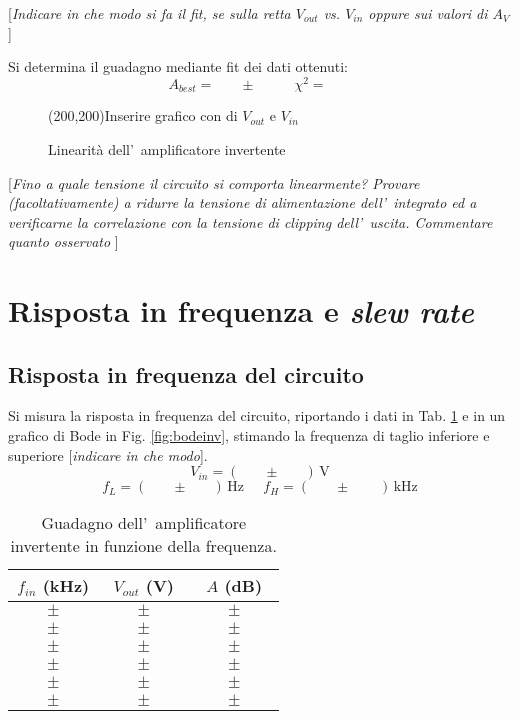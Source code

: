 \documentclass[10pt,a4paper]{article}
\newcommand{\rem}[1]{[\emph{#1}]}
\newcommand{\exn}{\phantom{xxx}}
\begin{document}
	\rem{Indicare in che modo si fa il fit, se sulla retta $V_{out}$ vs. $V_{in}$ oppure sui valori di $A_V$   }
	
	Si determina il guadagno mediante fit dei dati ottenuti:
	\[
	A_{best} = \exn \pm \exn \quad  \chi^2 = \exn
	\]
	\begin{figure}[t]
		\begin{center}
			\framebox(200,200){Inserire grafico con di $V_{out}$ e $V_{in}$}
		\end{center}
		\caption{\small Linearit\`a dell'~amplificatore invertente}
		\label{fig:lin}
	\end{figure}
	
	\rem{Fino a quale tensione il circuito si comporta linearmente? Provare (facoltativamente) a ridurre la 
		tensione di alimentazione dell'~integrato ed a verificarne la correlazione con la tensione di 
		\emph{clipping} dell'~uscita. Commentare quanto osservato }
	
	\section{Risposta in frequenza e \emph{slew rate}}
	\subsection{Risposta in frequenza del circuito}
	Si misura la risposta in frequenza del circuito, riportando i dati  in Tab. \ref{tab:bodeinv} e
	in un grafico di Bode in Fig. \ref{fig:bodeinv}, stimando la frequenza di taglio inferiore e 
	superiore \rem{indicare in che modo}.
	\[
	V_{in} = (\exn \pm \exn )\,\mathrm{V}
	\]
	\[
	f_L = (\exn \pm \exn )\,\mathrm{Hz}\;\;\;\;\;f_H = (\exn \pm \exn \;)\,\mathrm{kHz}
	\]
	\begin{table}[h]
		\caption{\small Guadagno dell'~amplificatore invertente in funzione della frequenza.}
		\label{tab:bodeinv}
		\begin{center}
			\begin{tabular}{|c|c|c|}
				\hline
				$f_{in}$ (kHz) & $V_{out}$ (V) & $A$ (dB) \\
				\hline
				$\exn \pm \exn $ & $\exn \pm \exn $ & $\exn \pm \exn $\\
				\hline
				$\exn \pm \exn $ & $\exn \pm \exn $ & $\exn \pm \exn $\\
				\hline
				$\exn \pm \exn $ & $\exn \pm \exn $ & $\exn \pm \exn $\\
				\hline
				$\exn \pm \exn $ & $\exn \pm \exn $ & $\exn \pm \exn $\\
				\hline
				$\exn \pm \exn $ & $\exn \pm \exn $ & $\exn \pm \exn $\\
				\hline
				$\exn \pm \exn $ & $\exn \pm \exn $ & $\exn \pm \exn $\\
				\hline
			\end{tabular}
		\end{center}
	\end{table} 
	
\end{document}
